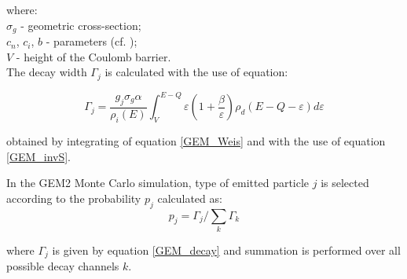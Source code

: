 where:\\
$\sigma_g$ - geometric cross-section; \\
$c_n$, $c_i$, $b$ - parameters (cf. \cite{FURIHATA2000,Furihata2002}); \\
$V$ - height of the Coulomb barrier.\\





The decay width $\Gamma_j$ is calculated with the use of equation:

\begin{equation}\label{GEM_decay}
	\Gamma_j = \frac{g_j\sigma_{g}\alpha}{\rho_{i}(E)} \int_{V}^{E-Q}{\varepsilon\left(1+\frac{\beta}{\varepsilon}\right)\rho_{d}\left(E-Q-\varepsilon\right)} d\varepsilon
\end{equation}

obtained by integrating of equation \ref{GEM_Weis}
and with the use of equation \ref{GEM_invS}.


In the GEM2 Monte Carlo simulation, type of emitted particle $j$ 
is selected according to the probability $p_j$ 
calculated as: 
\begin{equation}
\label{GEM_decay_p}
p_j= \Gamma _j/\sum _k \Gamma _k
\end{equation}

where  $\Gamma_j$ is given by equation \ref{GEM_decay} and summation is performed over all possible decay channels $k$.


